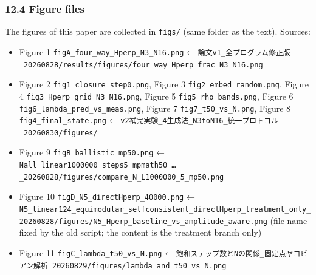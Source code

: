 \documentclass[
  10pt,
  a4paper,
]{article}
\providecommand{\tightlist}{%
  \setlength{\itemsep}{0pt}\setlength{\parskip}{0pt}}
\begin{document}
\subsubsection{12.4 Figure files}\label{figure-files}

The figures of this paper are collected in \texttt{figs/} (same folder
as the text). Sources:

\begin{itemize}
\tightlist
\item
  Figure 1 \texttt{figA\_four\_way\_Hperp\_N3\_N16.png} ←
  \texttt{論文v1\_全プログラム修正版\_20260828/results/figures/four\_way\_Hperp\_frac\_N3\_N16.png}
\item
  Figure 2 \texttt{fig1\_closure\_step0.png}, Figure 3
  \texttt{fig2\_embed\_random.png}, Figure 4
  \texttt{fig3\_Hperp\_grid\_N3\_N16.png}, Figure 5
  \texttt{fig5\_rho\_bands.png}, Figure 6
  \texttt{fig6\_lambda\_pred\_vs\_meas.png}, Figure 7
  \texttt{fig7\_t50\_vs\_N.png}, Figure 8
  \texttt{fig4\_final\_state.png} ←
  \texttt{v2補完実験\_4生成法\_N3toN16\_統一プロトコル\_20260830/figures/}
\item
  Figure 9 \texttt{figB\_ballistic\_mp50.png} ←
  \texttt{Nall\_linear1000000\_steps5\_mpmath50\_…\_20260828/figures/compare\_N\_L1000000\_5\_mp50.png}
\item
  Figure 10 \texttt{figD\_N5\_directHperp\_40000.png} ←
  \texttt{N5\_linear124\_equimodular\_selfconsistent\_directHperp\_treatment\_only\_20260828/figures/N5\_Hperp\_baseline\_vs\_amplitude\_aware.png}
  (file name fixed by the old script; the content is the treatment
  branch only)
\item
  Figure 11 \texttt{figC\_lambda\_t50\_vs\_N.png} ←
  \texttt{飽和ステップ数とNの関係\_固定点ヤコビアン解析\_20260829/figures/lambda\_and\_t50\_vs\_N.png}
\end{itemize}
\end{document}
